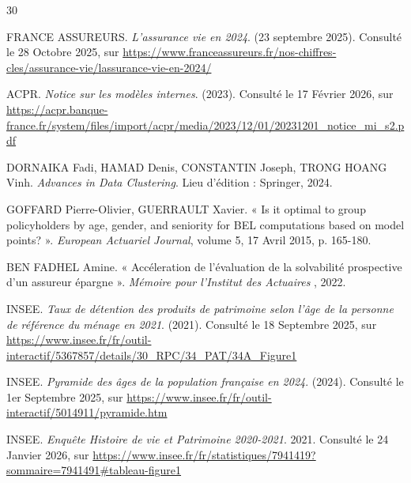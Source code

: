 \newpage %


\begin{thebibliography}{30}


FRANCE ASSUREURS. \textit{L'assurance vie en 2024}. (23 septembre 2025). Consulté le 28 Octobre 2025, sur \url{https://www.franceassureurs.fr/nos-chiffres-cles/assurance-vie/lassurance-vie-en-2024/}

ACPR. \textit{Notice sur les modèles internes}. (2023). Consulté le 17 Février 2026, sur \url{https://acpr.banque-france.fr/system/files/import/acpr/media/2023/12/01/20231201_notice_mi_s2.pdf}

DORNAIKA Fadi, HAMAD Denis, CONSTANTIN Joseph, TRONG HOANG Vinh. \textit{Advances in Data Clustering}. Lieu d'édition : Springer, 2024.

GOFFARD Pierre-Olivier, GUERRAULT Xavier. « Is it optimal to group policyholders by age, gender, and seniority for BEL computations based on model points? ». \textit{European Actuariel Journal}, volume 5, 17 Avril 2015, p. 165-180.


BEN FADHEL Amine. « Accéleration de l'évaluation de la solvabilité prospective d'un assureur épargne ». \textit{Mémoire pour l'Institut des Actuaires }, 2022.

INSEE. \textit{Taux de détention des produits de patrimoine selon l'âge de la personne de référence du ménage en 2021}. (2021). Consulté le 18 Septembre 2025, sur \url{https://www.insee.fr/fr/outil-interactif/5367857/details/30_RPC/34_PAT/34A_Figure1}

INSEE. \textit{Pyramide des âges de la population française en 2024}. (2024). Consulté le 1er Septembre 2025, sur \url{https://www.insee.fr/fr/outil-interactif/5014911/pyramide.htm}

INSEE. \textit{Enquête Histoire de vie et Patrimoine 2020-2021}. 2021. Consulté le 24 Janvier 2026, sur \url{https://www.insee.fr/fr/statistiques/7941419?sommaire=7941491#tableau-figure1}


\end{thebibliography}
